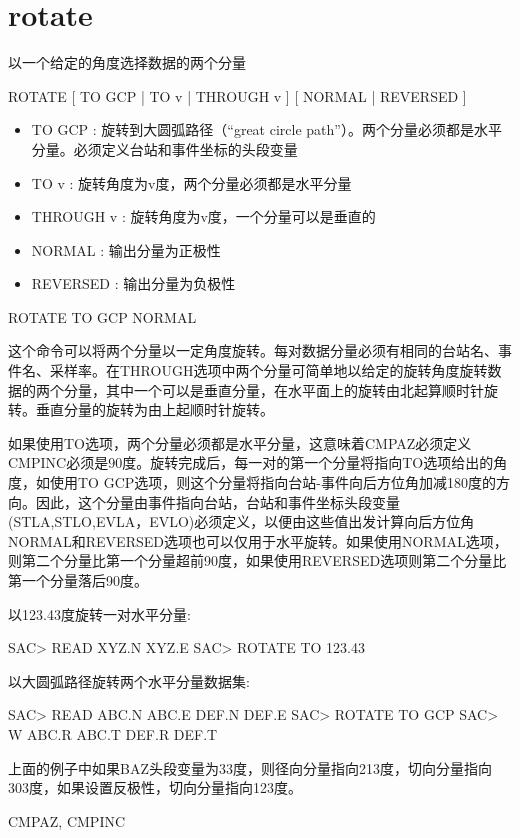\section{rotate}
\label{cmd:rotate}

以一个给定的角度选择数据的两个分量

ROTATE [ TO GCP | TO v | THROUGH v ] [ NORMAL | REVERSED ]

\begin{itemize}
\item TO GCP : 旋转到大圆弧路径（``great circle path''）。两个分量必须都是水平分量。必须定义台站和事件坐标的头段变量 
\item TO v : 旋转角度为v度，两个分量必须都是水平分量 
\item THROUGH v : 旋转角度为v度，一个分量可以是垂直的 
\item NORMAL : 输出分量为正极性 
\item REVERSED : 输出分量为负极性 
\end{itemize}

ROTATE TO GCP NORMAL

这个命令可以将两个分量以一定角度旋转。每对数据分量必须有相同的台站名、事件名、采样率。在THROUGH选项中两个分量可简单地以给定的旋转角度旋转数据的两个分量，其中一个可以是垂直分量，在水平面上的旋转由北起算顺时针旋转。垂直分量的旋转为由上起顺时针旋转。

如果使用TO选项，两个分量必须都是水平分量，这意味着CMPAZ必须定义CMPINC必须是90度。旋转完成后，每一对的第一个分量将指向TO选项给出的角度，如使用TO GCP选项，则这个分量将指向台站-事件向后方位角加减180度的方向。因此，这个分量由事件指向台站，台站和事件坐标头段变量(STLA,STLO,EVLA，EVLO)必须定义，以便由这些值出发计算向后方位角NORMAL和REVERSED选项也可以仅用于水平旋转。如果使用NORMAL选项，则第二个分量比第一个分量超前90度，如果使用REVERSED选项则第二个分量比第一个分量落后90度。

以123.43度旋转一对水平分量:
\begin{SACCode}
SAC> READ XYZ.N XYZ.E
SAC> ROTATE TO 123.43
\end{SACCode}
以大圆弧路径旋转两个水平分量数据集:
\begin{SACCode}
SAC> READ ABC.N ABC.E DEF.N DEF.E
SAC> ROTATE TO GCP
SAC> W ABC.R ABC.T DEF.R DEF.T
\end{SACCode}
上面的例子中如果BAZ头段变量为33度，则径向分量指向213度，切向分量指向303度，如果设置反极性，切向分量指向123度。

CMPAZ, CMPINC

